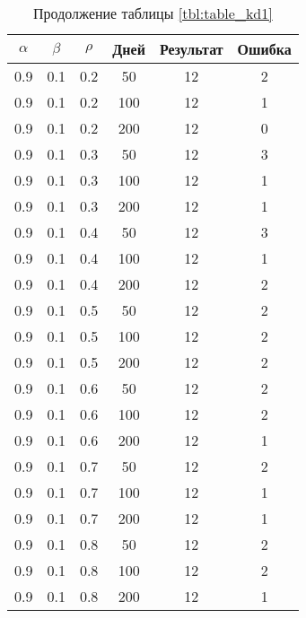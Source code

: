 \begin{table}[h]
	\begin{center}
        \begin{threeparttable}
        \captionsetup{justification=raggedright,singlelinecheck=off}
		\caption*{Продолжение таблицы \ref{tbl:table_kd1}}
		\begin{tabular}{|c|c|c|c|c|c|}
  	\hline
	$\alpha$ & $\beta$ & $\rho$ & Дней & Результат & Ошибка \\\hline
	0.9 &  0.1 &  0.2 &   50 &    12 &     2 \\
	0.9 &  0.1 &  0.2 &  100 &    12 &     1 \\
	0.9 &  0.1 &  0.2 &  200 &    12 &     0 \\
   \hline
	0.9 &  0.1 &  0.3 &   50 &    12 &     3 \\
	0.9 &  0.1 &  0.3 &  100 &    12 &     1 \\
	0.9 &  0.1 &  0.3 &  200 &    12 &     1 \\
   \hline
	0.9 &  0.1 &  0.4 &   50 &    12 &     3 \\
	0.9 &  0.1 &  0.4 &  100 &    12 &     1 \\
	0.9 &  0.1 &  0.4 &  200 &    12 &     2 \\
   \hline
	0.9 &  0.1 &  0.5 &   50 &    12 &     2 \\
	0.9 &  0.1 &  0.5 &  100 &    12 &     2 \\
	0.9 &  0.1 &  0.5 &  200 &    12 &     2 \\
   \hline
	0.9 &  0.1 &  0.6 &   50 &    12 &     2 \\
	0.9 &  0.1 &  0.6 &  100 &    12 &     2 \\
	0.9 &  0.1 &  0.6 &  200 &    12 &     1 \\
   \hline
	0.9 &  0.1 &  0.7 &   50 &    12 &     2 \\
	0.9 &  0.1 &  0.7 &  100 &    12 &     1 \\
	0.9 &  0.1 &  0.7 &  200 &    12 &     1 \\
   \hline
	0.9 &  0.1 &  0.8 &   50 &    12 &     2 \\
	0.9 &  0.1 &  0.8 &  100 &    12 &     2 \\
	0.9 &  0.1 &  0.8 &  200 &    12 &     1 \\
   \hline
		\end{tabular}
        \end{threeparttable}
	\end{center}
\end{table}

